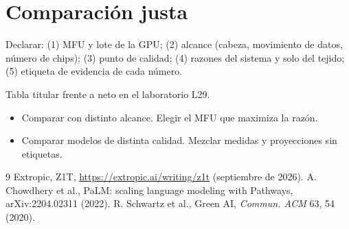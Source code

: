 \documentclass[11pt,a4paper]{article}
\begin{document}
\section{Comparación justa}
Declarar: (1) MFU y lote de la GPU; (2) alcance (cabeza, movimiento de datos, número de chips); (3) punto de calidad; (4) razones del sistema y solo del tejido; (5) etiqueta de
evidencia de cada número.

\begin{aplicacion}
Tabla titular frente a neto en el laboratorio L29.
\end{aplicacion}

\begin{error}
\begin{itemize}[nosep]
\item Comparar con distinto alcance. \quad Elegir el MFU que maximiza la razón.
\item Comparar modelos de distinta calidad. \quad Mezclar medidas y proyecciones sin etiquetas.
\end{itemize}
\end{error}

\begin{thebibliography}{9}\small
{} Extropic, Z1T, \url{https://extropic.ai/writing/z1t} (septiembre de 2026).
 A. Chowdhery et al., PaLM: scaling language modeling with Pathways, arXiv:2204.02311 (2022).
 R. Schwartz et al., Green AI, \emph{Commun. ACM} 63, 54 (2020).
\end{thebibliography}
\end{document}
